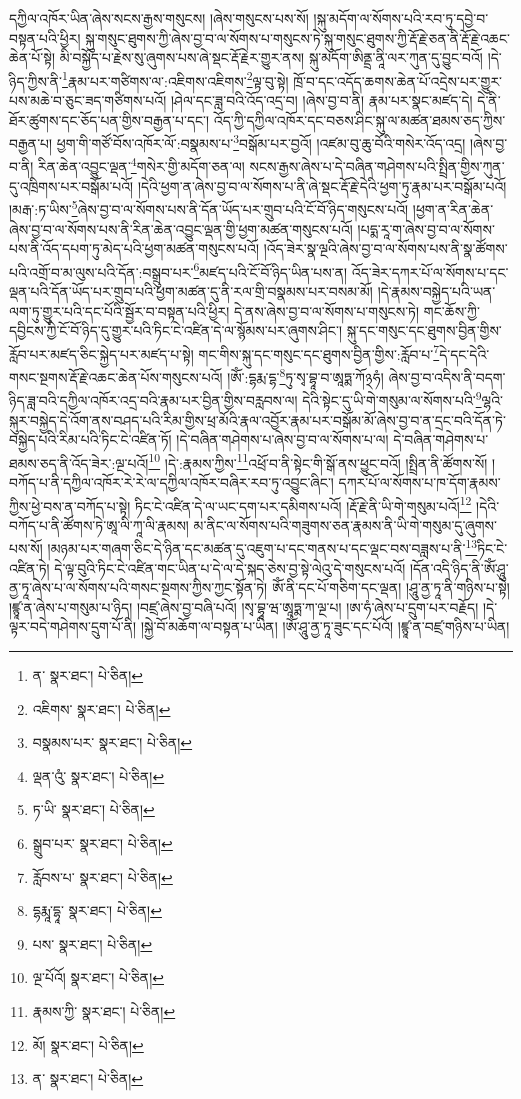 དཀྱིལ་འཁོར་ཡིན་ཞེས་སངས་རྒྱས་གསུངས། །ཞེས་གསུངས་པས་སོ། །སྐུ་མདོག་ལ་སོགས་པའི་རབ་ཏུ་དབྱེ་བ་བསྟན་པའི་ཕྱིར། སྐུ་གསུང་ཐུགས་ཀྱི་ཞེས་བྱ་བ་ལ་སོགས་པ་གསུངས་ཏེ་སྐུ་གསུང་ཐུགས་ཀྱི་རྡོ་རྗེ་ཅན་ནི་རྡོ་རྗེ་འཆང་ཆེན་པོ་སྟེ། མི་བསྐྱོད་པ་རྗེས་སུ་ཞུགས་པས་ཞེ་སྡང་རྡོ་རྗེར་གྱུར་ནས། སྐུ་མདོག་ཨིནྡྲ་ནཱི་ལར་ཀུན་དུ་བྱུང་བའོ། །དེ་ཉིད་ཀྱིས་ནི་\footnote{ན་  སྣར་ཐང་།  པེ་ཅིན། }རྣམ་པར་གཙིགས་ལ་:འཇིགས་འཇིགས་\footnote{འཇིགས་  སྣར་ཐང་།  པེ་ཅིན། }ལྟ་བུ་སྟེ། ཁྲོ་བ་དང་འདོད་ཆགས་ཆེན་པོ་འདྲེས་པར་གྱུར་པས་མཆེ་བ་ཅུང་ཟད་གཙིགས་པའོ། །ཤེལ་དང་ཟླ་བའི་འོད་འདྲ་བ། །ཞེས་བྱ་བ་ནི། རྣམ་པར་སྣང་མཛད་དེ། དེ་ནི་ཐོར་ཚུགས་དང་ཅོད་པན་གྱིས་བརྒྱན་པ་དང་། འོད་ཀྱི་དཀྱིལ་འཁོར་དང་བཅས་ཤིང་སྐུ་ལ་མཚན་ཐམས་ཅད་ཀྱིས་བརྒྱན་པ། ཕྱག་གི་གཙོ་བོས་འཁོར་ལོ་:བསྣམས་པ་\footnote{བསྣམས་པར་  སྣར་ཐང་།  པེ་ཅིན། }བསྒོམ་པར་བྱའོ། །འཛམ་བུ་ཆུ་བོའི་གསེར་འོད་འདྲ། །ཞེས་བྱ་བ་ནི། རིན་ཆེན་འབྱུང་ལྡན་\footnote{ལྡན་འུཾ་  སྣར་ཐང་།  པེ་ཅིན། }གསེར་གྱི་མདོག་ཅན་ལ། སངས་རྒྱས་ཞེས་པ་དེ་བཞིན་གཤེགས་པའི་སྤྲིན་གྱིས་ཀུན་དུ་འཁྲིགས་པར་བསྒོམ་པའོ། །དེའི་ཕྱག་ན་ཞེས་བྱ་བ་ལ་སོགས་པ་ནི་ཞེ་སྡང་རྡོ་རྗེ་དེའི་ཕྱག་ཏུ་རྣམ་པར་བསྒོམ་པའོ། །མརྒ་:ཏ་ཡིས་\footnote{ཏ་ཡི་  སྣར་ཐང་།  པེ་ཅིན། }ཞེས་བྱ་བ་ལ་སོགས་པས་ནི་དོན་ཡོད་པར་གྲུབ་པའི་ངོ་བོ་ཉིད་གསུངས་པའོ། །ཕྱག་ན་རིན་ཆེན་ཞེས་བྱ་བ་ལ་སོགས་པས་ནི་རིན་ཆེན་འབྱུང་ལྡན་གྱི་ཕྱག་མཚན་གསུངས་པའོ། །པདྨ་རཱ་ག་ཞེས་བྱ་བ་ལ་སོགས་པས་ནི་འོད་དཔག་ཏུ་མེད་པའི་ཕྱག་མཚན་གསུངས་པའོ། །འོད་ཟེར་སྣ་ལྔའི་ཞེས་བྱ་བ་ལ་སོགས་པས་ནི་སྣ་ཚོགས་པའི་འགྲོ་བ་མ་ལུས་པའི་དོན་:བསྒྲུབ་པར་\footnote{སྒྲུབ་པར་  སྣར་ཐང་།  པེ་ཅིན། }མཛད་པའི་ངོ་བོ་ཉིད་ཡིན་པས་ན། འོད་ཟེར་དཀར་པོ་ལ་སོགས་པ་དང་ལྡན་པའི་དོན་ཡོད་པར་གྲུབ་པའི་ཕྱག་མཚན་དུ་ནི་རལ་གྲི་བསྣམས་པར་བསམ་མོ། །དེ་རྣམས་བསྐྱེད་པའི་ཡན་ལག་ཏུ་གྱུར་པའི་དང་པོའི་སྦྱོར་བ་བསྟན་པའི་ཕྱིར། དེ་ནས་ཞེས་བྱ་བ་ལ་སོགས་པ་གསུངས་ཏེ། གང་ཆོས་ཀྱི་དབྱིངས་ཀྱི་ངོ་བོ་ཉིད་དུ་གྱུར་པའི་ཏིང་ངེ་འཛིན་དེ་ལ་སྙོམས་པར་ཞུགས་ཤིང་། སྐུ་དང་གསུང་དང་ཐུགས་བྱིན་གྱིས་རློབ་པར་མཛད་ཅིང་སྐྱེད་པར་མཛད་པ་སྟེ། གང་གིས་སྐུ་དང་གསུང་དང་ཐུགས་བྱིན་གྱིས་:རློབ་པ་\footnote{རློབས་པ་  སྣར་ཐང་།  པེ་ཅིན། }དེ་དང་དེའི་གསང་སྔགས་རྡོ་རྗེ་འཆང་ཆེན་པོས་གསུངས་པའོ། །ཨོཾ་:དྷརྨ་དྷ་\footnote{དྷརྨཱ་དྷཱ་  སྣར་ཐང་།  པེ་ཅིན། }ཏུ་སྭ་བྷཱ་བ་ཨཱཏྨ་ཀོ྅ཧཾ། ཞེས་བྱ་བ་འདིས་ནི་བདག་ཉིད་ཟླ་བའི་དཀྱིལ་འཁོར་འདྲ་བའི་རྣམ་པར་བྱིན་གྱིས་བརླབས་ལ། དེའི་སྟེང་དུ་ཡི་གེ་གསུམ་ལ་སོགས་པའི་\footnote{པས་  སྣར་ཐང་།  པེ་ཅིན། }ལྷའི་སྐུར་བསྐྱེད་དེ་འོག་ནས་བཤད་པའི་རིམ་གྱིས་ཕྲ་མོའི་རྣལ་འབྱོར་རྣམ་པར་བསྒོམ་མོ་ཞེས་བྱ་བ་ན་དྲང་བའི་དོན་ཏེ་བསྐྱེད་པའི་རིམ་པའི་ཏིང་ངེ་འཛིན་ཏོ། །དེ་བཞིན་གཤེགས་པ་ཞེས་བྱ་བ་ལ་སོགས་པ་ལ། དེ་བཞིན་གཤེགས་པ་ཐམས་ཅད་ནི་འོད་ཟེར་:ལྔ་པའོ།\footnote{ལྔ་པོའོ།  སྣར་ཐང་།  པེ་ཅིན། } །དེ་:རྣམས་ཀྱིས་\footnote{རྣམས་ཀྱི་  སྣར་ཐང་།  པེ་ཅིན། }འཕྲོ་བ་ནི་སྟེང་གི་སྒོ་ནས་ཕྱུང་བའོ། །སྤྲིན་ནི་ཚོགས་སོ། །བཀོད་པ་ནི་དཀྱིལ་འཁོར་རེ་རེ་ལ་དཀྱིལ་འཁོར་བཞིར་རབ་ཏུ་འབྱུང་ཞིང་། དཀར་པོ་ལ་སོགས་པ་ཁ་དོག་རྣམས་ཀྱིས་ཕྱེ་བས་ན་བཀོད་པ་སྟེ། ཏིང་ངེ་འཛིན་དེ་ལ་ཡང་དག་པར་དམིགས་པའོ། །རྡོ་རྗེ་ནི་ཡི་གེ་གསུམ་པའོ།\footnote{མོ།  སྣར་ཐང་།  པེ་ཅིན། } །དེའི་བཀོད་པ་ནི་ཚོགས་ཏེ་ཨཱ་ལི་ཀཱ་ལི་རྣམས། མ་ནིང་ལ་སོགས་པའི་གཟུགས་ཅན་རྣམས་ནི་ཡི་གེ་གསུམ་དུ་ཞུགས་པས་སོ། །མཉམ་པར་གཞག་ཅིང་དེ་ཉིན་དང་མཚན་དུ་འཇུག་པ་དང་གནས་པ་དང་ལྡང་བས་བཟླས་པ་ནི་\footnote{ན་  སྣར་ཐང་།  པེ་ཅིན། }ཏིང་ངེ་འཛིན་ཏེ། དེ་ལྟ་བུའི་ཏིང་ངེ་འཛིན་གང་ཡིན་པ་དེ་ལ་དེ་སྐད་ཅེས་བྱ་སྟེ་ལེའུ་དེ་གསུངས་པའོ། །དོན་འདི་ཉིད་ནི་ཨོཾ་ཤཱུ་ནྱ་ཏཱ་ཞེས་པ་ལ་སོགས་པའི་གསང་སྔགས་ཀྱིས་ཀྱང་སྟོན་ཏེ། ཨོཾ་ནི་དང་པོ་གཅིག་དང་ལྡན། །ཤཱུ་ནྱ་ཏཱ་ནི་གཉིས་པ་སྟེ། །ཛྙཱ་ན་ཞེས་པ་གསུམ་པ་ཉིད། །བཛྲ་ཞེས་བྱ་བཞི་པའོ། །སྭ་བྷཱ་ཝ་ཨཱཏྨ་ཀ་ལྔ་པ། །ཨ་ཧཾ་ཞེས་པ་དྲུག་པར་བརྗོད། །དེ་ལྟར་བདེ་གཤེགས་དྲུག་པོ་ནི། །སྐྱེ་བོ་མཆོག་ལ་བསྟན་པ་ཡིན། །ཨོཾ་ཤཱུ་ནྱ་ཏཱ་ཟུང་དང་པོའོ། །ཛྙཱ་ན་བཛྲ་གཉིས་པ་ཡིན། 